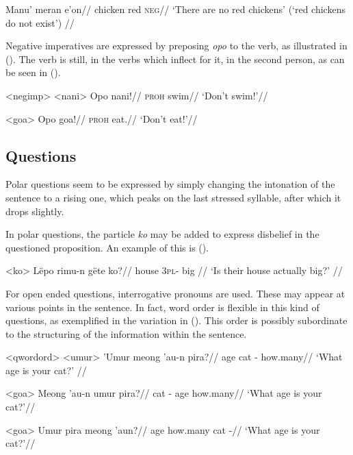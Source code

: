 \documentclass[12pt]{article}
\begin{document}
\begingl %
\gla Manu' meran e'on//
\glb chicken red \textsc{neg}//
\glft `There are no red chickens' (`red chickens do not exist') // 
\endgl
\xe

Negative imperatives are expressed by preposing \textit{opo} to the verb, as illustrated in (). The verb is still, in the verbs which inflect for it, in the second person, as can be seen in ().

\pex<negimp> %
\a<nani> %
\begingl %
\gla Opo nani!//
\glb \textsc{proh} swim//
\glft `Don't swim!'//
\endgl

\a<goa> %
\begingl %
\gla Opo goa!//
\glb \textsc{proh} eat.\Second{}\Sg{}//
\glft `Don't eat!'// 
\endgl
\xe

\subsection{Questions}

Polar questions seem to be expressed by simply changing the intonation of the sentence to a rising one, which peaks on the last stressed syllable, after which it drops slightly. %

In polar questions, the particle \textit{ko} may be added to express disbelief in the questioned proposition. An example of this is ().

\ex<ko>
\begingl %
\gla Lëpo rimu-n gëte ko?//
\glb house 3\textsc{pl}-\Poss{} big \Q{}//
\glft `Is their house actually big?' // 
\endgl 
\xe

For open ended questions, interrogative pronouns are used. These may appear at various points in the sentence. In fact, word order is flexible in this kind of questions, as exemplified in the variation in (). This order is possibly subordinate to the structuring of the information within the sentence.

\pex<qwordord> %
\a<umur>
\begingl %
\gla 'Umur meong 'au-n pira?//
\glb age cat \Second{}\Sg{}-\Poss{} how.many//
\glft `What age is your cat?' // 
\endgl 

\a<goa> %
\begingl %
\gla Meong 'au-n umur pira?//
\glb cat \Second{}\Sg{}-\Poss{} age how.many//
\glft `What age is your cat?'// 
\endgl

\a<goa> %
\begingl %
\gla Umur pira meong 'aun?//
\glb age how.many cat \Second{}\Sg{}-\Poss{}//
\glft `What age is your cat?'// 
\endgl
\xe
\end{document}
